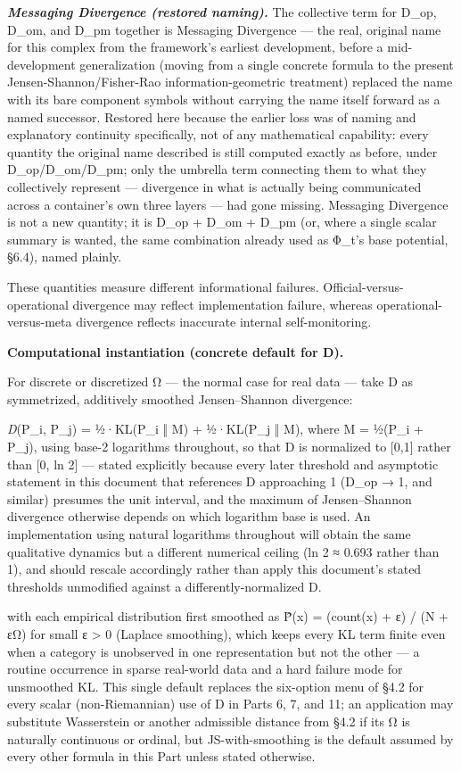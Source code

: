 \documentclass[
]{article}
\begin{document}
\emph{\textbf{Messaging Divergence (restored naming).}} The collective
term for D\_op, D\_om, and D\_pm together is Messaging Divergence ---
the real, original name for this complex from the framework's earliest
development, before a mid-development generalization (moving from a
single concrete formula to the present Jensen-Shannon/Fisher-Rao
information-geometric treatment) replaced the name with its bare
component symbols without carrying the name itself forward as a named
successor. Restored here because the earlier loss was of naming and
explanatory continuity specifically, not of any mathematical capability:
every quantity the original name described is still computed exactly as
before, under D\_op/D\_om/D\_pm; only the umbrella term connecting them
to what they collectively represent --- divergence in what is actually
being communicated across a container's own three layers --- had gone
missing. Messaging Divergence is not a new quantity; it is D\_op + D\_om
+ D\_pm (or, where a single scalar summary is wanted, the same
combination already used as Φ\_t's base potential, §6.4), named plainly.

These quantities measure different informational failures.
Official-versus-operational divergence may reflect implementation
failure, whereas operational-versus-meta divergence reflects inaccurate
internal self-monitoring.

\textbf{Computational instantiation (concrete default for D).}

For discrete or discretized Ω --- the normal case for real data --- take
D as symmetrized, additively smoothed Jensen--Shannon divergence:

\emph{D}(P\_i, P\_j) = ½·KL(P\_i ‖ M) + ½·KL(P\_j ‖ M), where M = ½(P\_i
+ P\_j), using base-2 logarithms throughout, so that D is normalized to
{[}0,1{]} rather than {[}0, ln 2{]} --- stated explicitly because every
later threshold and asymptotic statement in this document that
references D approaching 1 (D\_op → 1, and similar) presumes the unit
interval, and the maximum of Jensen--Shannon divergence otherwise
depends on which logarithm base is used. An implementation using natural
logarithms throughout will obtain the same qualitative dynamics but a
different numerical ceiling (ln 2 ≈ 0.693 rather than 1), and should
rescale accordingly rather than apply this document's stated thresholds
unmodified against a differently-normalized D.

with each empirical distribution first smoothed as P̂(x) = (count(x) + ε)
/ (N + εΩ) for small ε \textgreater{} 0 (Laplace smoothing), which keeps
every KL term finite even when a category is unobserved in one
representation but not the other --- a routine occurrence in sparse
real-world data and a hard failure mode for unsmoothed KL. This single
default replaces the six-option menu of §4.2 for every scalar
(non-Riemannian) use of D in Parts 6, 7, and 11; an application may
substitute Wasserstein or another admissible distance from §4.2 if its Ω
is naturally continuous or ordinal, but JS-with-smoothing is the default
assumed by every other formula in this Part unless stated otherwise.
\end{document}
